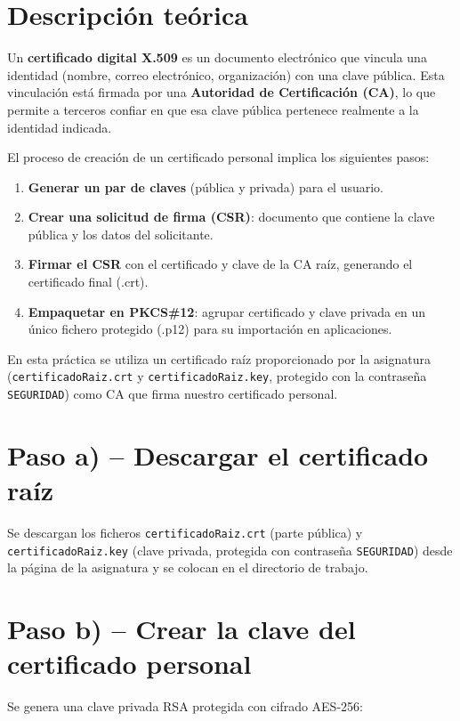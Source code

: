 \section{Descripción teórica}

Un \textbf{certificado digital X.509} es un documento electrónico que vincula una identidad (nombre, correo electrónico, organización) con una clave pública. Esta vinculación está firmada por una \textbf{Autoridad de Certificación (CA)}, lo que permite a terceros confiar en que esa clave pública pertenece realmente a la identidad indicada.

El proceso de creación de un certificado personal implica los siguientes pasos:

\begin{enumerate}
    \item \textbf{Generar un par de claves} (pública y privada) para el usuario.
    \item \textbf{Crear una solicitud de firma (CSR)}: documento que contiene la clave pública y los datos del solicitante.
    \item \textbf{Firmar el CSR} con el certificado y clave de la CA raíz, generando el certificado final (.crt).
    \item \textbf{Empaquetar en PKCS\#12}: agrupar certificado y clave privada en un único fichero protegido (.p12) para su importación en aplicaciones.
\end{enumerate}

En esta práctica se utiliza un certificado raíz proporcionado por la asignatura (\texttt{certificadoRaiz.crt} y \texttt{certificadoRaiz.key}, protegido con la contraseña \texttt{SEGURIDAD}) como CA que firma nuestro certificado personal.

\section{Paso a) -- Descargar el certificado raíz}

Se descargan los ficheros \texttt{certificadoRaiz.crt} (parte pública) y \texttt{certificadoRaiz.key} (clave privada, protegida con contraseña \texttt{SEGURIDAD}) desde la página de la asignatura y se colocan en el directorio de trabajo.

\section{Paso b) -- Crear la clave del certificado personal}

Se genera una clave privada RSA protegida con cifrado AES-256:

